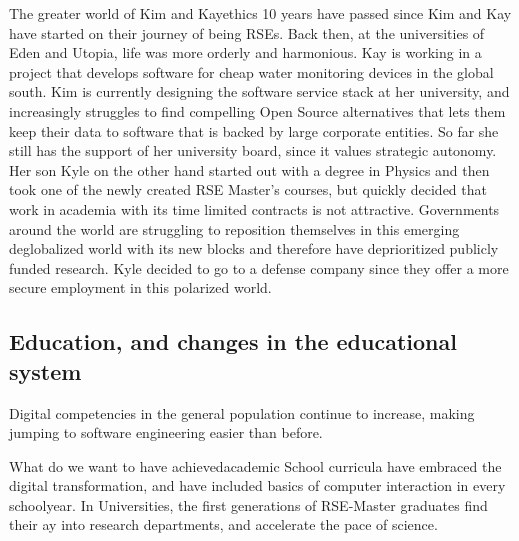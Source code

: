 \documentclass{eceasst}
\begin{document}
\begin{story}{The greater world of Kim and Kay}{ethics}
10 years have passed since Kim and Kay have started on their journey of being RSEs. Back then,
at the universities of Eden and Utopia, life was more orderly and harmonious. Kay is working in a project that develops
software for cheap water monitoring devices in the global south. Kim is currently designing the software service stack
at her university, and increasingly struggles to find compelling Open Source alternatives that lets them keep their data
to software that is backed by large corporate entities. So far she still has the support of her university board, since it values
strategic autonomy.
Her son Kyle on the other hand started out with a degree in Physics and then took one of the newly created RSE Master's courses,
but quickly decided that work in academia with its time limited contracts is not attractive.
Governments around the world are struggling to reposition themselves in this emerging deglobalized world with its new blocks
and therefore have deprioritized publicly funded research. Kyle decided to go to a defense company since they offer a
more secure employment in this polarized world.
\end{story}

\subsection{Education, and changes in the educational system}
Digital competencies in the general population continue to increase, making jumping to software engineering easier than before.

\begin{whatis}{What do we want to have achieved}{academic}
School curricula have embraced the digital transformation, and have included basics of computer interaction
in every schoolyear.
In Universities, the first generations of RSE-Master graduates find their ay into research departments,
and accelerate the pace of science.
\end{whatis}
\end{document}

